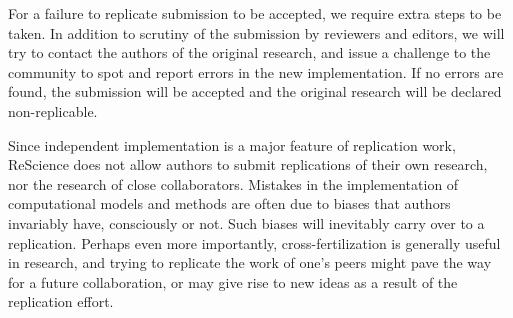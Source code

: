 \documentclass[a4paper,10pt, twocolumn]{article}
\begin{document}
For a failure to replicate submission to be accepted, we require extra steps
to be taken. In addition to scrutiny of the submission by reviewers and
editors, we will try to contact the authors of the original research, and issue
a challenge to the community to spot and report errors in the new implementation.
If no errors are found, the submission will be accepted and the original
research will be declared non-replicable.

%

Since independent implementation is a major feature of replication
work, ReScience does not allow authors to submit replications of their
own research, nor the research of close collaborators. Mistakes in the
implementation of computational models and methods are often due to
biases that authors invariably have, consciously or not. Such biases
will inevitably carry over to a replication. Perhaps even more
importantly, cross-fertilization is generally useful in research, and
trying to replicate the work of one’s peers might pave the way for a
future collaboration, or may give rise to new ideas as a result of the
replication effort.




\end{document}
